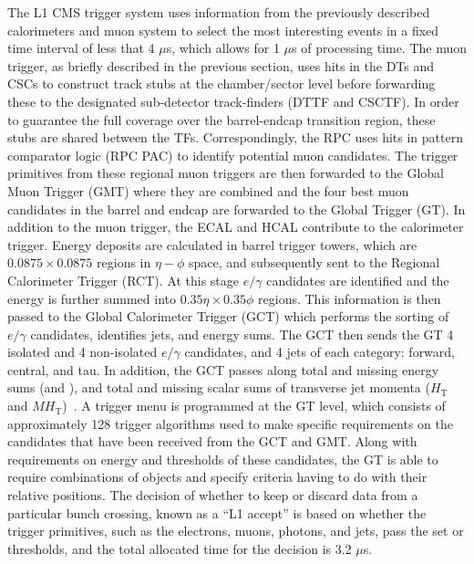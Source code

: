 The L1 CMS trigger system uses information from the previously described calorimeters and muon system to select the most interesting events in a fixed time interval of less that 4 $\mu$s, which allows for 1 $\mu$s of processing time. The muon trigger, as briefly described in the previous section, uses hits in the DTs and CSCs to construct track stubs at the chamber/sector level before forwarding these to the designated sub-detector track-finders (DTTF and CSCTF). In order to guarantee the full coverage over the barrel-endcap transition region, these stubs are shared between the TFs. Correspondingly, the RPC uses hits in pattern comparator logic (RPC PAC) to identify potential muon candidates. The trigger primitives from these regional muon triggers are then forwarded to the Global Muon Trigger (GMT) where they are combined and the four best muon candidates in the barrel and endcap are forwarded to the Global Trigger (GT). In addition to the muon trigger, the ECAL and HCAL contribute to the calorimeter trigger. Energy deposits are calculated in barrel trigger towers, which are $0.0875\times 0.0875$ regions in $\eta-\phi$ space, and subsequently sent to the Regional Calorimeter Trigger (RCT). At this stage $e/\gamma$ candidates are identified and the energy is further summed into $0.35\eta\times 0.35\phi$ regions. This information is then passed to the Global Calorimeter Trigger (GCT) which performs the sorting of $e/\gamma$ candidates, identifies jets, and energy sums. The GCT then sends the GT 4 isolated and 4 non-isolated $e/\gamma$ candidates, and 4 jets of each category: forward, central, and tau. In addition, the GCT passes along total and missing energy sums (\Et and \missingEt), and total and missing scalar sums of transverse jet momenta ($H_\mathrm{T}$ and $MH_\mathrm{T}$)~\cite{Brooke:2013hnf}. A trigger menu is programmed at the GT level, which consists of approximately 128 trigger algorithms used to make specific requirements on the candidates that have been received from the GCT and GMT. Along with requirements on energy and \pt thresholds of these candidates, the GT is able to require combinations of objects and specify criteria having to do with their relative positions. The decision of whether to keep or discard data from a particular bunch crossing, known as a ``L1 accept'' is based on whether the trigger primitives, such as the electrons, muons, photons, and jets, pass the set \Et or \pt thresholds, and the total allocated time for the decision is 3.2 $\mu$s.

